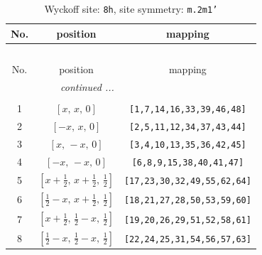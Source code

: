 \documentclass[fleqn,8pt]{jsarticle}
\begin{document}
\begin{longtable}{ccc}
\caption{Wyckoff site: {\tt 8h}, site symmetry: {\tt m.2m1'}}
 \\
 \hline \hline
No. & position & mapping \\ \hline \endfirsthead

\multicolumn{2}{l}{\tablename\ \thetable{}} \\
 \hline \hline
No. & position & mapping \\ \hline \endhead

 \hline \hline
\multicolumn{2}{r}{\footnotesize\it continued ...} \\ \endfoot

 \hline \hline
\multicolumn{2}{r}{} \\ \endlastfoot

1 & $\left[ x,\, x,\, 0 \right]$ & {\tt [1,7,14,16,33,39,46,48]} \\ \hline
2 & $\left[ - x,\, x,\, 0 \right]$ & {\tt [2,5,11,12,34,37,43,44]} \\ \hline
3 & $\left[ x,\, - x,\, 0 \right]$ & {\tt [3,4,10,13,35,36,42,45]} \\ \hline
4 & $\left[ - x,\, - x,\, 0 \right]$ & {\tt [6,8,9,15,38,40,41,47]} \\ \hline
5 & $\left[ x + \frac{1}{2},\, x + \frac{1}{2},\, \frac{1}{2} \right]$ & {\tt [17,23,30,32,49,55,62,64]} \\ \hline
6 & $\left[ \frac{1}{2} - x,\, x + \frac{1}{2},\, \frac{1}{2} \right]$ & {\tt [18,21,27,28,50,53,59,60]} \\ \hline
7 & $\left[ x + \frac{1}{2},\, \frac{1}{2} - x,\, \frac{1}{2} \right]$ & {\tt [19,20,26,29,51,52,58,61]} \\ \hline
8 & $\left[ \frac{1}{2} - x,\, \frac{1}{2} - x,\, \frac{1}{2} \right]$ & {\tt [22,24,25,31,54,56,57,63]} \\
\end{longtable}
\renewcommand{\arraystretch}{1.2}
\end{document}
